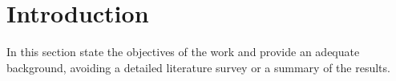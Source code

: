 \documentclass[12pt, twoside]{article}
\begin{document}
\maketitle

\section{Introduction}
\noindent %
In this section state the objectives of the work and provide an adequate background, avoiding a detailed literature survey or a summary of the results. 
%
%
%
%
%



\end{document}
